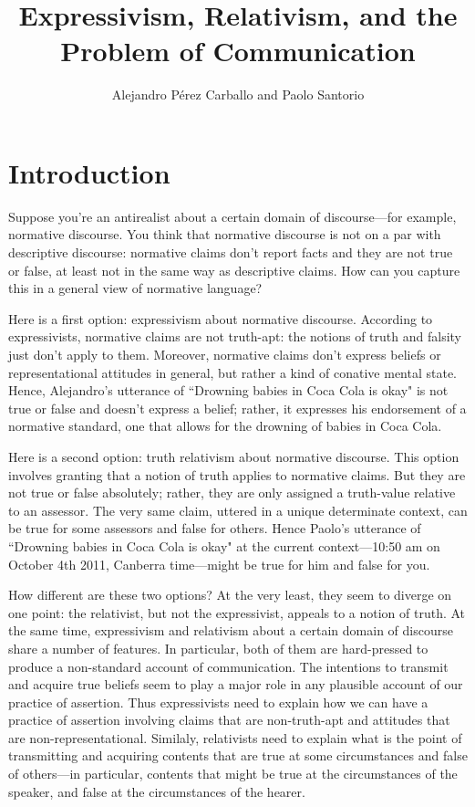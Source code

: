 \documentclass[11pt,article,oneside]{memoir}
\title{Expressivism, Relativism, and the Problem of Communication}
\author{Alejandro P\'erez Carballo and Paolo Santorio}
\begin{document}
\maketitle
	
\noindent

\section{Introduction}

Suppose you're an antirealist about a certain domain of discourse---for example, normative discourse. You think that normative discourse is not on a par with descriptive discourse: normative claims don't report facts and they are not true or false, at least not in the same way as descriptive claims. How can you capture this in a general view of normative language?

Here is a first option: expressivism about normative discourse. According to expressivists, normative claims are not truth-apt: the notions of truth and falsity just don't apply to them. Moreover, normative claims don't express beliefs or representational attitudes in general, but rather a kind of conative mental state. Hence, Alejandro's utterance of ``Drowning babies in Coca Cola is okay" is not true or false and doesn't express a belief; rather, it expresses his endorsement of a normative standard, one that allows for the drowning of babies in Coca Cola. 

Here is a second option: truth relativism about normative discourse. This option involves granting that a notion of truth applies to normative claims. But they are not true or false absolutely; rather, they are only assigned a truth-value relative to an assessor. The very same claim, uttered in a unique determinate context, can be true for some assessors and false for others. Hence Paolo's utterance of  ``Drowning babies in Coca Cola is okay" at the current context---10:50 am on October 4th 2011, Canberra time---might be true for him and false for you.

How different are these two options? At the very least, they seem to diverge on one point: the relativist, but not the expressivist, appeals to a notion of truth. At the same time, expressivism and relativism about a certain domain of discourse share a number of features. In particular, both of them are hard-pressed to produce a non-standard account of communication. The intentions to transmit and acquire true beliefs seem to play a major role in any plausible account of our practice of assertion. Thus expressivists need to explain how we can have a practice of assertion involving claims that are non-truth-apt and attitudes that are non-representational. Similaly, relativists need to explain what is the point of transmitting and acquiring contents that are true at some circumstances and false of others---in particular, contents that might be true at the circumstances of the speaker, and false at the circumstances of the hearer. 
\end{document}
